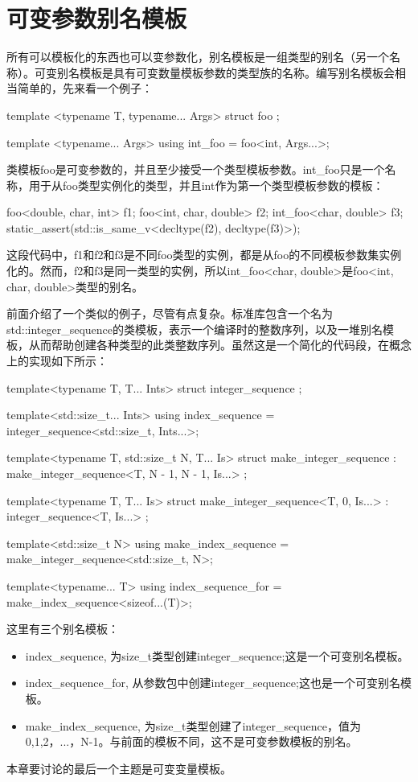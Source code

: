 \section{可变参数别名模板}
所有可以模板化的东西也可以变参数化，别名模板是一组类型的别名（另一个名称）。可变别名模板是具有可变数量模板参数的类型族的名称。编写别名模板会相当简单的，先来看一个例子：

\begin{cpp}
template <typename T, typename... Args>
struct foo
{
};

template <typename... Args>
using int_foo = foo<int, Args...>;
\end{cpp}

类模板foo是可变参数的，并且至少接受一个类型模板参数。int\_foo只是一个名称，用于从foo类型实例化的类型，并且int作为第一个类型模板参数的模板：

\begin{cpp}
foo<double, char, int> f1;
foo<int, char, double> f2;
int_foo<char, double> f3;
static_assert(std::is_same_v<decltype(f2), decltype(f3)>);
\end{cpp}

这段代码中，f1和f2和f3是不同foo类型的实例，都是从foo的不同模板参数集实例化的。然而，f2和f3是同一类型的实例，所以int\_foo<char, double>是foo<int, char, double>类型的别名。

前面介绍了一个类似的例子，尽管有点复杂。标准库包含一个名为std::integer\_sequence的类模板，表示一个编译时的整数序列，以及一堆别名模板，从而帮助创建各种类型的此类整数序列。虽然这是一个简化的代码段，在概念上的实现如下所示：

\begin{cpp}
template<typename T, T... Ints>
struct integer_sequence
{};

template<std::size_t... Ints>
using index_sequence = integer_sequence<std::size_t,
								        Ints...>;

template<typename T, std::size_t N, T... Is>
struct make_integer_sequence :
	make_integer_sequence<T, N - 1, N - 1, Is...>
{};

template<typename T, T... Is>
struct make_integer_sequence<T, 0, Is...> :
	integer_sequence<T, Is...>
{};

template<std::size_t N>
using make_index_sequence = make_integer_sequence<std::size_t,
												  N>;

template<typename... T>
using index_sequence_for =
	make_index_sequence<sizeof...(T)>;
\end{cpp}

这里有三个别名模板：

\begin{itemize}
\item
index\_sequence, 为size\_t类型创建integer\_sequence;这是一个可变别名模板。

\item
index\_sequence\_for, 从参数包中创建integer\_sequence;这也是一个可变别名模板。

\item
make\_index\_sequence, 为size\_t类型创建了integer\_sequence，值为0,1,2，...，N-1。与前面的模板不同，这不是可变参数模板的别名。
\end{itemize}

本章要讨论的最后一个主题是可变变量模板。











